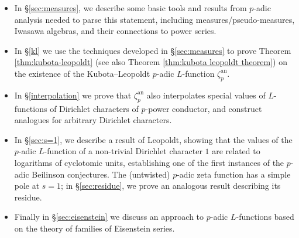 \documentclass[a4paper,10pt, english, reqno]{smfart}
\numberwithin{equation}{section}
\begin{document}
\begin{itemize}

\item[$\bullet$]  
 In \S\ref{sec:measures}, we describe some basic tools and results from $p$-adic analysis needed to parse this statement, including measures/pseudo-measures, Iwasawa algebras, and their connections to power series. 

\item[$\bullet$] In \S \ref{kl} we use the techniques developed in \S\ref{sec:measures} to prove Theorem \ref{thm:kubota-leopoldt} (see also Theorem \ref{thm:kubota leopoldt theorem}) on the existence of the Kubota--Leopoldt $p$-adic $L$-function $\zeta_p^{\mathrm{an}}$. 

\item[$\bullet$] In \S \ref{interpolation} we prove that $\zeta_p^{\mathrm{an}}$ also interpolates special values of $L$-functions of Dirichlet characters of $p$-power conductor, and construct analogues for arbitrary Dirichlet characters.

\item[$\bullet$] In \S\ref{sec:s=1}, we describe a result of Leopoldt, showing that the values of the $p$-adic $L$-function of a non-trivial Dirichlet character $1$ are related to logarithms of cyclotomic units, establishing one of the first instances of the $p$-adic Beilinson conjectures. The (untwisted) $p$-adic zeta function has a simple pole at $s=1$; in \S\ref{sec:residue}, we prove an analogous result describing its residue.

\item[$\bullet$] Finally in \S \ref{sec:eisenstein} we discuss an approach to $p$-adic $L$-functions based on the theory of families of Eisenstein series.
\end{itemize}
\end{document}
